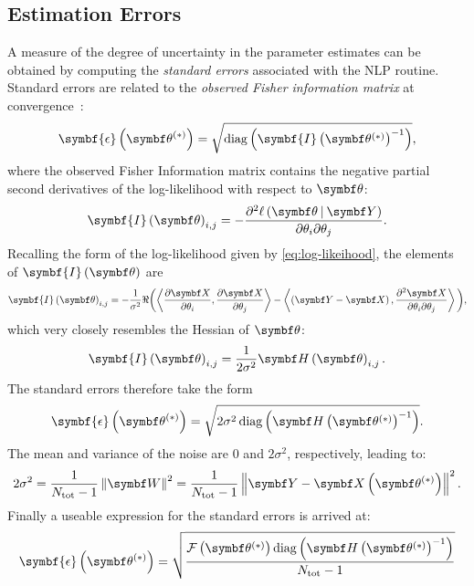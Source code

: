 \subsection{Estimation Errors}
\label{subsec:errors}
A measure of the degree of uncertainty in the parameter estimates can be obtained
by computing the \emph{standard errors} associated with the \ac{NLP} routine.
Standard errors are related  to the \emph{observed Fisher information matrix}
at convergence~\cite[Section 2.7]{Pawitan2001}:
\begin{equation}
    \symbf{\epsilon}\left(\bthstar\right) = \sqrt{\diag\left(\symbf{I}\left( \bthstar \right)^{-1}\right)},
\end{equation}
where the observed Fisher Information matrix contains the negative partial second
derivatives of the log-likelihood with respect to $\bth$:
\begin{equation}
    \symbf{I}\left(\bth\right)_{i, j} =
        -\frac
        {\partial^2 \ell \left( \bdthY \right)}
        {\partial \theta_i \partial \theta_j}.
\end{equation}
Recalling the form of the log-likelihood given by \cref{eq:log-likeihood},
the elements of $\symbf{I}\left(\bth\right)$ are
\begin{equation}
    \symbf{I}\left(\bth\right)_{i, j} =
        -\frac{1}{\sigma^2}
        \Re
        \biggl(
            \left\langle
                \frac{\partial \bX}{\partial \theta_i},
                \frac{\partial \bX}{\partial \theta_j}
            \right\rangle
            -
            \left\langle
                \left(\bY - \bX\right),
                \frac{\partial^2 \bX}{\partial \theta_i \partial \theta_j}
            \right\rangle
        \biggl),
\end{equation}
which very closely resembles the Hessian of $\bth$:
\begin{equation}
    \symbf{I}\left(\bth\right)_{i,j} =
        \frac{1}{2 \sigma^2}
            \bdHth_{i,j}.
\end{equation}
The standard errors therefore take the form
\begin{equation}
    \symbf{\epsilon}\left(\bthstar\right) =
        \sqrt{
            2\sigma^2 \diag \left(
                \bdHthstar^{-1}
            \right)
        }.
\end{equation}
The mean and variance of the noise are $0$ and $2\sigma^2$, respectively,
leading to:
\begin{equation}
    2 \sigma^2 = \frac{1}{N_{\text{tot}} - 1}
    \left\lVert \bW \right\rVert^2 =
    \frac{1}{N_{\text{tot}} - 1} \left \lVert
        \bY - \bXthstar
    \right \rVert^2.
\end{equation}
Finally a useable expression for the standard errors is arrived at:
\begin{equation}
    \symbf{\epsilon}\left(\bthstar\right) =
        \sqrt{
            \frac
            {
                \Fthstar \diag \left(
                    \bdHthstar^{-1}
                \right)
            }
            {N_{\text{tot}} - 1}
        }
\end{equation}



